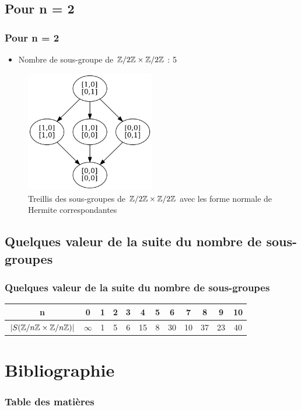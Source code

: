 \documentclass[10pt]{beamer}
\begin{document}
\subsection{Pour n = 2}
\begin{frame}
    \frametitle{Pour n = 2}
    \begin{itemize}
        \item Nombre de sous-groupe de $\mathbb Z/2\mathbb Z \times \mathbb Z/2\mathbb Z$ : 5
    \end{itemize}
    \begin{figure}
        \centering
        \includegraphics[width=0.5\textwidth]{Z2ZxZ2Z.png}
        \caption{Treillis des sous-groupes de $\mathbb Z/2\mathbb Z \times \mathbb Z/2\mathbb Z$ avec les forme normale de Hermite
            correspondantes}
    \end{figure}
\end{frame}


\subsection{Quelques valeur de la suite du nombre de sous-groupes}
\begin{frame}
    \frametitle{Quelques valeur de la suite du nombre de sous-groupes}
    \begin{center}
        \begin{tabular}{|c|c|c|c|c|c|c|c|c|c|c|c|}
            \hline
            n          & 0        & 1 & 2 & 3 & 4  & 5 & 6  & 7  & 8  & 9  & 10 \tabularnewline
            \hline
            $|S(\mathbb Z/n\mathbb Z \times \mathbb Z/n\mathbb Z)|$ & $\infty$ & 1 & 5 & 6 & 15 & 8 & 30 & 10 & 37 & 23 & 40 \tabularnewline
            \hline
        \end{tabular}
    \end{center}
\end{frame}


\section{Bibliographie}
\begin{frame}
    \frametitle{Table des matières}
    \tableofcontents[currentsection]
\end{frame}
\end{document}
